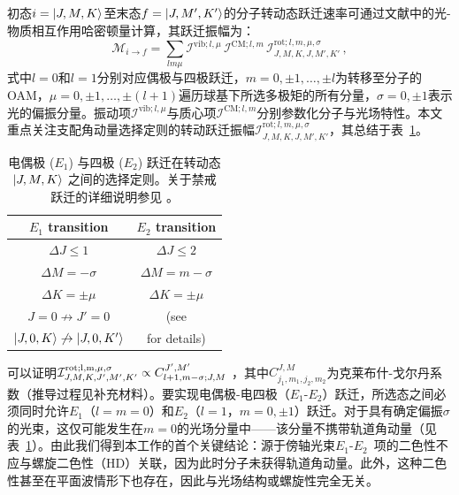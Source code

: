 \documentclass[reprint,aps,prl,twocolumn,superscriptaddress,groupedaddress]{revtex4-2}
\newcommand{\eoet}{$E_1$-$E_2$}
\begin{document}
初态$i=\ket{J,M,K}$至末态$f=\ket{J,M',K'}$的分子转动态跃迁速率可通过文献\cite{Maslov2024,Maslov_Thesis}中的光-物质相互作用哈密顿量计算，其跃迁振幅为：
\begin{equation}
    \mathcal{M}_{i\to f}=\sum_{lm\mu}\mathcal{I}^{\text{vib}; l,\mu}\,\mathcal{I}^{\text{CM}; l,m}\,\mathcal{I}^{\text{rot}; l,m,\mu,\sigma}_{J,M,K,J,M',K'}\,,
    \label{eq_transition_matrix}
\end{equation}
式中$l=0$和$l=1$分别对应偶极与四极跃迁，$m = 0, \pm 1, \dots, \pm l$为转移至分子的OAM，$\mu = 0, \pm 1, \dots, \pm (l+1)$遍历球基下所选多极矩的所有分量，$\sigma =0, \pm 1$表示光的偏振分量。振动项$\mathcal{I}^{\text{vib}; l,\mu}$与质心项$\mathcal{I}^{\text{CM}; l,m}$分别参数化分子与光场特性。本文重点关注支配角动量选择定则的转动跃迁振幅$\mathcal{I}^{\text{rot};l,m,\mu,\sigma}_{J,M,K,J,M',K'}$，其总结于表~\ref{SelectionRules}。
\begin{table}[ht!]
    \centering
    \begin{tabular}{c c}\hline
    \toprule
        \textbf{$E_1$ transition} & \textbf{$E_2$ transition}  \\
        \midrule
        $\Delta J\leq 1$ &  $\Delta J\leq 2$ \\
        $\Delta M=-\sigma$ & $\Delta M=m-\sigma$ \\
        $\Delta K=\pm\mu$ & $\Delta K=\pm\mu$ \\
        $J=0\not\to J'=0$ &  (see \cite{Note1}\\
        $\ket{J,0,K}\not\to\ket{J,0,K'}$ &  for details)\\
    \bottomrule
\hline
    \end{tabular}
    \caption{电偶极 ($E_1$) 与四极 ($E_2$) 跃迁在转动态 $\ket{J,M,K}$ 之间的选择定则。关于禁戒跃迁的详细说明参见 \cite{Note1}。}
    \label{SelectionRules}
\end{table}
可以证明$\mathcal{I}^{\rm rot; l, m, \mu, \sigma}_{J, M, K, J', M', K'} \propto C^{J',M'}_{l+1, m-\sigma; J, M}$ \cite{Maslov2024,Maslov_Thesis}，其中$C^{J, M}_{j_1, m_1, j_2, m_2}$为克莱布什-戈尔丹系数（推导过程见补充材料\cite{Note1}）。要实现电偶极-电四极（\eoet）跃迁，所选态之间必须同时允许$E_1$（$l=m=0$）和$E_2$（$l = 1$，$m = 0, \pm 1$）跃迁。对于具有确定偏振$\sigma$的光束，这仅可能发生在$m = 0$的光场分量中——该分量不携带轨道角动量（见表~\ref{SelectionRules}）。由此我们得到本工作的首个关键结论：源于傍轴光束\eoet~项的二色性不应与螺旋二色性（HD）关联，因为此时分子未获得轨道角动量。此外，这种二色性甚至在平面波情形下也存在，因此与光场结构或螺旋性完全无关。
\end{document}
